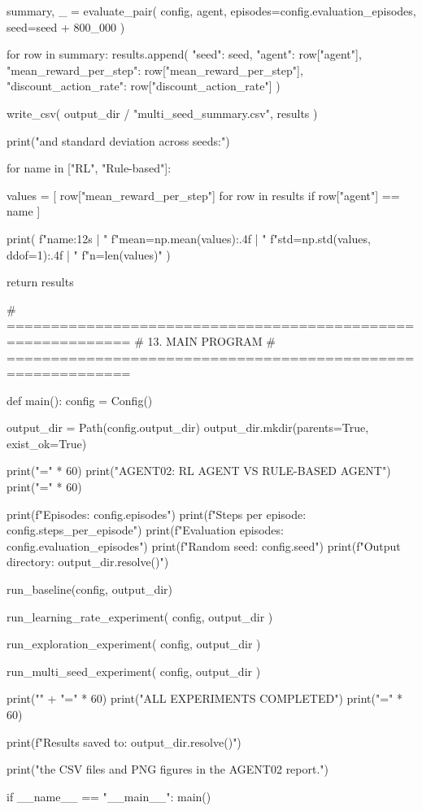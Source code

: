         summary, _ = evaluate_pair(
            config,
            agent,
            episodes=config.evaluation_episodes,
            seed=seed + 800_000
        )

        for row in summary:
            results.append({
                "seed": seed,
                "agent": row["agent"],
                "mean_reward_per_step":
                    row["mean_reward_per_step"],
                "discount_action_rate":
                    row["discount_action_rate"]
            })

    write_csv(
        output_dir / "multi_seed_summary.csv",
        results
    )

    print("\nMean and standard deviation across seeds:")

    for name in ["RL", "Rule-based"]:

        values = [
            row["mean_reward_per_step"]
            for row in results
            if row["agent"] == name
        ]

        print(
            f"{name:12s} | "
            f"mean={np.mean(values):.4f} | "
            f"std={np.std(values, ddof=1):.4f} | "
            f"n={len(values)}"
        )

    return results


# ============================================================
# 13. MAIN PROGRAM
# ============================================================

def main():
    config = Config()

    output_dir = Path(config.output_dir)
    output_dir.mkdir(parents=True, exist_ok=True)

    print("=" * 60)
    print("AGENT02: RL AGENT VS RULE-BASED AGENT")
    print("=" * 60)

    print(f"Episodes: {config.episodes}")
    print(f"Steps per episode: {config.steps_per_episode}")
    print(f"Evaluation episodes: {config.evaluation_episodes}")
    print(f"Random seed: {config.seed}")
    print(f"Output directory: {output_dir.resolve()}")

    run_baseline(config, output_dir)

    run_learning_rate_experiment(
        config, output_dir
    )

    run_exploration_experiment(
        config, output_dir
    )

    run_multi_seed_experiment(
        config, output_dir
    )

    print("\n" + "=" * 60)
    print("ALL EXPERIMENTS COMPLETED")
    print("=" * 60)

    print(f"Results saved to: {output_dir.resolve()}")

    print("\nUse the CSV files and PNG figures in the AGENT02 report.")


if __name__ == "__main__":
    main()
